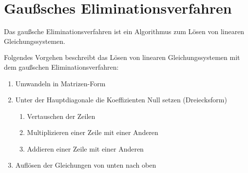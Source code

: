 \section{Gaußsches Eliminationsverfahren}
Das gaußsche Eliminationsverfahren ist ein Algorithmus zum Lösen von linearen Gleichungssystemen.

\begin{procedure}
Folgendes Vorgehen beschreibt das Lösen von linearen Gleichungssystemen mit dem gaußschen Eliminationsverfahren:
\begin{enumerate}
  \item Umwandeln in Matrizen-Form
  \item Unter der Hauptdiagonale die Koeffizienten Null setzen (Dreiecksform)
  \begin{enumerate}
    \item Vertauschen der Zeilen
    \item Multiplizieren einer Zeile mit einer Anderen
    \item Addieren einer Zeile mit einer Anderen
  \end{enumerate}
  \item Auflösen der Gleichungen von unten nach oben
\end{enumerate}
\end{procedure}

